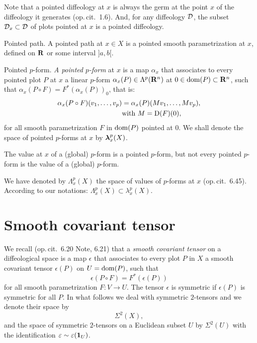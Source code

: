 Note that a pointed diffeology at $x$ is always the germ at the point $x$ of the diffeology it generates (op.\,cit. \textsection\,1.6).
And,
for any diffeology $\mathcal{D}$,
the subset $\mathcal{D}_x \subset \mathcal{D}$ of plots pointed at $x$ is a pointed diffeology.

\begin{Article}{Pointed path.}{}
  A pointed path at $x \in X$ is a pointed smooth parametrization at $x$,
  defined on $\mathbf{R}$ or some interval $]a,b[$.
\end{Article}

\begin{Article}{Pointed $p$-form.}{}
  \emph{A pointed $p$-form} at $x$ is a map $\alpha_x$ that associates to every pointed plot $P$ at $x$ a linear $p$-form $\alpha_x(P) \in \Lambda^p(\mathbf{R}^n)$ at $0 \in \mathrm{dom}(P) \subset \mathbf{R}^n$,
  such that $\alpha_x(P \circ F) = F^*(\alpha_x(P))_0$,
  that is:
  \begin{align*}
    \alpha_x(P \circ F)(v_1,\ldots,v_p) & = \alpha_x(P)(M v_1,\ldots,M v_p),\\
    & \text{with} \ M = \operatorname{D}(F)(0),
  \end{align*}
  for all smooth parametrization $F$ in $\mathrm{dom}(P)$ pointed at $0$.
  We shall denote the space of pointed $p$-forms at $x$ by ${\boldsymbol \lambda}^p_x(X)$.
  
  \Note The value at $x$ of a (global) $p$-form is a pointed $p$-form,
  but not every pointed $p$-form is the value of a (global) $p$-form.
  
  We have denoted by $\Lambda_x^p(X)$ the space of values of $p$-forms at $x$ (op.\,cit. \textsection\,6.45).
  According to our notations:
  $
    \Lambda_x^p(X) \subset \lambda_x^p(X).
    $
\end{Article}

\section{Smooth covariant tensor}

We recall (op.\,cit. \textsection\,6.20 Note, 6.21) that a \emph{smooth covariant tensor} on a diffeological space is a map $\epsilon$ that associates to every plot $P$ in $X$ a smooth covariant tensor $\epsilon(P)$ on $U = \mathrm{dom}(P)$,
such that
$$
  \epsilon(P \circ F) = F^*(\epsilon(P))
  $$
for all smooth parametrization $F : V \to U$.
The tensor $\epsilon$ is symmetric if $\epsilon(P)$ is symmetric for all $P$.
In what follows we deal with symmetric $2$-tensors and we denote their space by
$$
  \Sigma^2(X),
  $$
and the space of symmetric $2$-tensors on a Euclidean subset $U$ by $\Sigma^2(U)$ with the identification $\varepsilon \sim \varepsilon({\mathbf{1}}_U)$.

